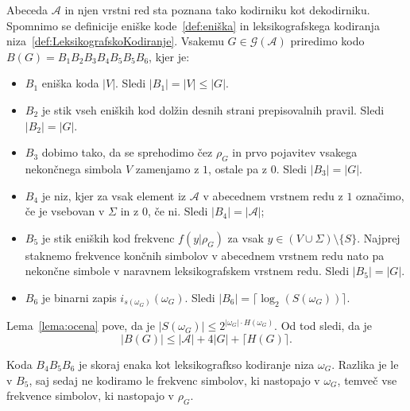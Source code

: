 \documentclass[fin1, tisk]{fmfdelo}
\providecommand{\abs}[1]{\left\lvert #1 \right\rvert}
\newcommand{\A}{\mathcal{A}}
\newcommand{\G}{\mathcal{G}}
\theoremstyle{definition}
\begin{document}
\begin{dokaz}
    Abeceda $\A$ in njen vrstni red sta poznana tako kodirniku kot dekodirniku.
    Spomnimo se definicije eniške kode~\ref{def:eniška} in leksikografskega 
    kodiranja niza~\ref{def:LeksikografskoKodiranje}.
    Vsakemu $G \in \G(\A)$ priredimo kodo $B(G) = B_1B_2B_3B_4B_5B_5B_6$, kjer je:
    \begin{itemize}
        \item $B_1$ eniška koda $\abs{V}$. Sledi $\abs{B_1} = \abs{V} \leq \abs{G}$.
        \item $B_2$ je stik vseh eniških kod dolžin desnih strani prepisovalnih pravil. Sledi 
        $\abs{B_2} = \abs{G}$.

        \item $B_3$ dobimo tako, da se sprehodimo čez $\rho_G$ in prvo pojavitev vsakega
        nekončnega simbola $V$ zamenjamo z $1$, ostale pa z $0$. Sledi $\abs{B_3} = \abs{G}$.
        \item $B_4$ je niz, kjer za vsak element iz $\A$ v abecednem vrstnem redu z 
        $1$ označimo, če je vsebovan v $\Sigma$ in z $0$, če ni. Sledi $\abs{B_4} = \abs{\A}$;
        \item $B_5$ je stik eniških kod frekvenc $f(y|\rho_G)$ za vsak 
        $y \in (V \cup \Sigma) \setminus \{ S \}$. Najprej staknemo frekvence končnih simbolov v 
        abecednem vrstnem redu nato pa nekončne simbole v naravnem leksikografskem vrstnem redu.
        Sledi $\abs{B_5} = \abs{G}$.
        \item $B_6$ je binarni zapis $i_{s(\omega_G)}(\omega_G)$. Sledi 
        $\abs{B_6} = \lceil \log_2(S(\omega_G)) \rceil$.
    \end{itemize}
    Lema~\ref{lema:ocena} pove, da je $\abs{S(\omega_G)} \leq 2^{\abs{\omega_G} \cdot H(\omega_G)}$.
    Od tod sledi, da je 
    \[
        \abs{B(G)} \leq \abs{\A} + 4 \abs{G} + \lceil H(G) \rceil.
    \]
\end{dokaz}

\begin{opomba}
    Koda $B_4B_5B_6$ je skoraj enaka kot leksikografkso kodiranje niza $\omega_G$. Razlika je le 
    v $B_5$, saj sedaj ne kodiramo le frekvenc simbolov, ki nastopajo v $\omega_G$, temveč vse
    frekvence simbolov, ki nastopajo v $\rho_G$.
\end{opomba}
\end{document}
